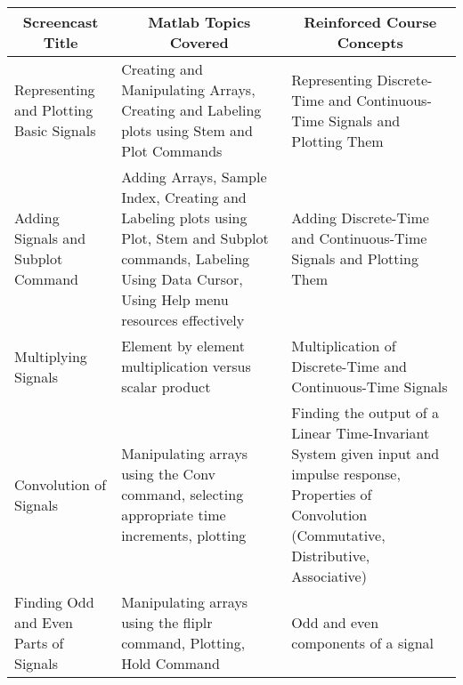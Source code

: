 \documentclass[11pt,a4paper]{article}
\begin{document}
\begin{tabularx}{\textwidth}{|X|X|X|}
\hline
\multicolumn{1}{|c|}{\textbf{Screencast Title}} & \multicolumn{1}{c|}{\textbf{Matlab Topics Covered}} & \multicolumn{1}{c|}{\textbf{Reinforced Course Concepts}} \\ \hline
Representing and Plotting Basic Signals & Creating and Manipulating Arrays, Creating and Labeling plots using Stem and Plot Commands & Representing Discrete-Time and Continuous-Time Signals and Plotting Them\\
\hline  
Adding Signals and Subplot Command & Adding Arrays, Sample Index, Creating and Labeling plots using Plot, Stem and Subplot commands, Labeling Using Data Cursor, Using Help menu resources effectively & Adding Discrete-Time and Continuous-Time Signals and Plotting Them\\
\hline  
Multiplying Signals & Element by element multiplication versus scalar product & Multiplication of Discrete-Time and Continuous-Time Signals\\
\hline  
Convolution of Signals & Manipulating arrays using the Conv command, selecting appropriate time increments, plotting & Finding the output of a Linear Time-Invariant System given input and impulse response, Properties of Convolution (Commutative, Distributive, Associative) \\
\hline
Finding Odd and Even Parts of Signals & Manipulating arrays using the fliplr command, Plotting, Hold Command & Odd and even components of a signal\\ \hline

\end{tabularx}
\end{document}
